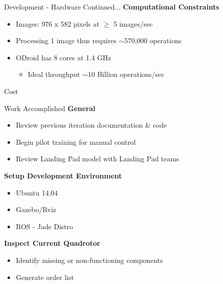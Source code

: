 \documentclass[11pt]{beamer}
\begin{document}
\begin{frame}{Development - Hardware Continued...}
	\textbf{Computational Constraints}
	\begin{itemize}
		\item Images: 976 x 582 pixels at $\ge$ 5 images/sec
		\item Processing 1 image thus requires $\sim$570,000 operations
		\item ODroid has 8 cores at 1.4 GHz
		\begin{itemize}
			\item Ideal throughput $\sim$10 Billion operations/sec
		\end{itemize}
	\end{itemize}
\end{frame}

\begin{frame}{Cost}
\end{frame}

\begin{frame}{Work Accomplished}
\textbf{General}
\begin{itemize}
\item Review previous iteration documentation \& code
\item Begin pilot training for manual control
\item Review Landing Pad model with Landing Pad teams
\end{itemize}
\vspace{4mm}
\textbf{Setup Development Environment}
\begin{itemize}
\item Ubuntu 14.04
\item Gazebo/Rviz
\item ROS - Jade Distro
\end{itemize}
\vspace{4mm}
\textbf{Inspect Current Quadrotor}
\begin{itemize}
\item Identify missing or non-functioning components 
\item Generate order list
\end{itemize}
\end{frame}
\end{document}
